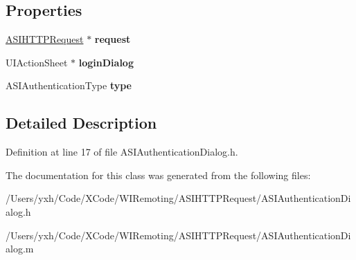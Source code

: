 \subsection*{Properties}
\begin{DoxyCompactItemize}
\item 
\hypertarget{interface_a_s_i_authentication_dialog_a81f6906124b139ce97634beb09753e26}{
\hyperlink{interface_a_s_i_h_t_t_p_request}{ASIHTTPRequest} $\ast$ {\bfseries request}}
\label{interface_a_s_i_authentication_dialog_a81f6906124b139ce97634beb09753e26}

\item 
\hypertarget{interface_a_s_i_authentication_dialog_a837705d54e469fe8a7b2b2be020b9731}{
UIActionSheet $\ast$ {\bfseries loginDialog}}
\label{interface_a_s_i_authentication_dialog_a837705d54e469fe8a7b2b2be020b9731}

\item 
\hypertarget{interface_a_s_i_authentication_dialog_a5b64f718db2c00f0fe624e3e8ed89930}{
ASIAuthenticationType {\bfseries type}}
\label{interface_a_s_i_authentication_dialog_a5b64f718db2c00f0fe624e3e8ed89930}

\end{DoxyCompactItemize}


\subsection{Detailed Description}


Definition at line 17 of file ASIAuthenticationDialog.h.

The documentation for this class was generated from the following files:\begin{DoxyCompactItemize}
\item 
/Users/yxh/Code/XCode/WIRemoting/ASIHTTPRequest/ASIAuthenticationDialog.h\item 
/Users/yxh/Code/XCode/WIRemoting/ASIHTTPRequest/ASIAuthenticationDialog.m\end{DoxyCompactItemize}
